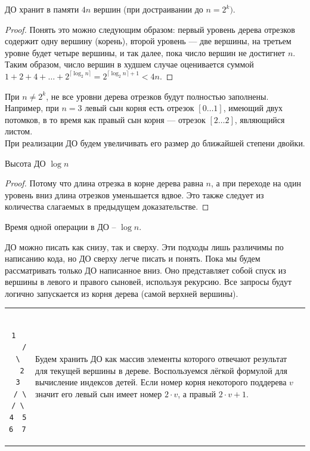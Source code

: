 \begin{Thm}\label{thm@splay}
ДО хранит в памяти $4n$ вершин (при достраивании до $n=2^k)$.\end{Thm}
\begin{proof}
Понять это можно следующим образом: первый уровень дерева отрезков содержит одну вершину (корень), второй уровень — две вершины, на третьем уровне будет четыре вершины, и так далее, пока число вершин не достигнет $n$. Таким образом, число вершин в худшем случае оценивается суммой 
$1 + 2 + 4 + \dots + 2^{\lceil\log_2 n\rceil} = 2^{\lceil\log_2 n\rceil + 1} < 4n$.
\end{proof}

\begin{Rem}При $n \ne 2^k$, не все уровни дерева отрезков будут полностью заполнены. Например, при $n=3$ левый сын корня есть отрезок $[0 \ldots 1]$, имеющий двух потомков, в то время как правый сын корня — отрезок $[2 \ldots 2]$, являющийся листом. \\
При реализации ДО будем увеличивать его размер до ближайшей степени двойки.
\end{Rem}

\begin{Thm}\label{thm@splay}
Высота ДО $\log n$\end{Thm}
\begin{proof}
Потому что длина отрезка в корне дерева равна $n$, а при переходе на один уровень вниз длина отрезков уменьшается вдвое. Это также следует из количества слагаемых в предыдущем доказательстве.
\end{proof}

\begin{Cons}Время одной операции в ДО -- $\log n$.\end{Cons}

\pagebreak
\up\up\up
{}

ДО можно писать как снизу, так и сверху. Эти подходы лишь различимы по написанию кода, но ДО сверху легче писать и понять. Пока мы будем рассматривать только ДО написанное { вниз}. Оно представляет собой спуск из вершины в левого и правого сыновей, используя рекурсию. Все запросы будут логично запускается из корня дерева (самой верхней вершины).

\down
\begin{tabular}{cm{15cm}}
	\begin{minipage}{2.5cm}
\begin{verbatim}
    1  
   / \
  2   3
 / \ / \
4  5 6  7      
\end{verbatim}
	\end{minipage} 
	&
Будем хранить ДО как массив элементы которого отвечают результат для текущей вершины в дереве.
Воспользуемся лёгкой формулой для вычисление индексов детей. Если номер корня некоторого поддерева $v$ значит его левый сын имеет номер $2 \cdot v$, а правый $2 \cdot v + 1$.
\end{tabular}
\down


